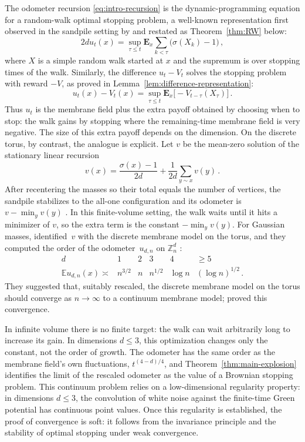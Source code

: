 \documentclass[11pt]{amsart}
\theoremstyle{plain}
\theoremstyle{definition}
\newcommand{\Z}{\mathbb{Z}}
\newcommand{\E}{\mathbb{E}}
\begin{document}
The odometer recursion \eqref{eq:intro-recursion} is the dynamic-programming equation for a random-walk optimal stopping problem, a well-known representation \citep[Chapter~I]{PeskirShiryaev} first observed in the sandpile setting by \citet*[Theorem~3.2]{BPSH} and restated as Theorem~\ref{thm:RW} below:
\[
2d u_t(x)=\sup_{\tau\leq t}\mathbf E_x\sum_{k<\tau}\bigl(\sigma(X_k)-1\bigr)\, ,
\]
where $X$ is a simple random walk started at $x$ and the supremum is over stopping times of the walk. Similarly, the difference $u_t-V_t$ solves the stopping problem with reward $-V$, as proved in Lemma~\ref{lem:difference-representation}:
\[
u_t(x)-V_t(x)=\sup_{\tau\leq t}\mathbf E_x\bigl[-V_{t-\tau}(X_\tau)\bigr]\, .
\]
Thus $u_t$ is the membrane field plus the extra payoff obtained by choosing when to stop: the walk gains by stopping where the remaining-time membrane field is very negative. The size of this extra payoff depends on the dimension. On the discrete torus, by contrast, the analogue is explicit. Let $v$ be the mean-zero solution of the stationary linear recursion
\[
v(x)=\frac{\sigma(x)-1}{2d}+\frac1{2d}\sum_{y\sim x}v(y)\, .
\]
After recentering the masses so their total equals the number of vertices, the sandpile stabilizes to the all-one configuration and its odometer is $v-\min_y v(y)$ \citep[Lemma~7.1]{LMPU}. In this finite-volume setting, the walk waits until it hits a minimizer of $v$, so the extra term is the constant $-\min_y v(y)$. For Gaussian masses, \citet*[Proposition~1.3]{LMPU} identified~$v$ with the discrete membrane model on the torus, and they computed the order of the odometer~$u_{d,n}$ on $\Z_n^d$ \citep[Theorem~1.2]{LMPU}:
\[
\begin{array}{c|ccccc}
d & 1 & 2 & 3 & 4 & \geq5\\
\hline
\E u_{d,n}(x)\asymp & n^{3/2} & n & n^{1/2} & \log n & (\log n)^{1/2} \, .
\end{array}
\]
They suggested that, suitably rescaled, the discrete membrane model on the torus should converge as $n\to\infty$ to a continuum membrane model; \citet[Theorem~2]{CHR} proved this convergence.

In infinite volume there is no finite target: the walk can wait arbitrarily long to increase its gain. In dimensions $d\leq3$, this optimization changes only the constant, not the order of growth. The odometer has the same order as the membrane field's own fluctuations, $t^{(4-d)/4}$, and Theorem~\ref{thm:main-explosion} identifies the limit of the rescaled odometer as the value of a Brownian stopping problem. This continuum problem relies on a low-dimensional regularity property: in dimensions $d\leq3$, the convolution of white noise against the finite-time Green potential has continuous point values. Once this regularity is established, the proof of convergence is soft: it follows from the invariance principle and the stability of optimal stopping under weak convergence.
\end{document}
